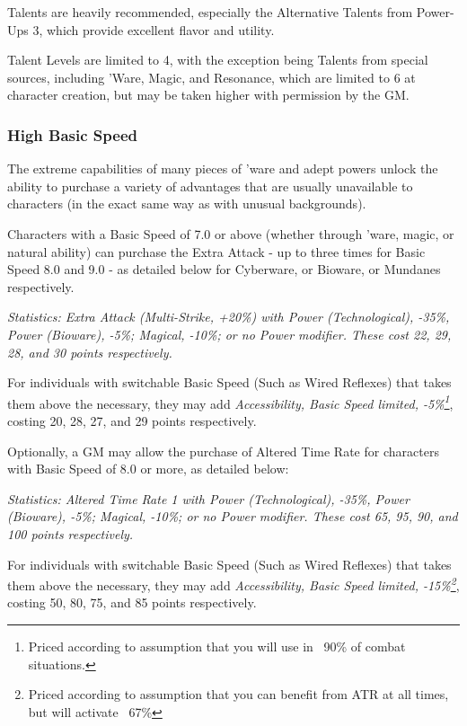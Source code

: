 \begin{multicols*}{3}
	Talents are heavily recommended, especially the Alternative Talents from Power-Ups 3, which provide excellent flavor and utility. 
	
	Talent Levels are limited to 4, with the exception being Talents from special sources, including 'Ware, Magic, and Resonance, which are limited to 6 at character creation, but may be taken higher with permission by the GM.
	
	\subsubsection{High Basic Speed}\label{high_basic_speed}
	
	The extreme capabilities of many pieces of 'ware and adept powers unlock the ability to purchase a variety of advantages that are usually unavailable to characters (in the exact same way as with unusual backgrounds).
	
	Characters with a Basic Speed of 7.0 or above (whether through 'ware, magic, or natural ability) can purchase the Extra Attack - up to three times for Basic Speed 8.0 and 9.0 - as detailed below for Cyberware, or Bioware, or Mundanes respectively.
	
	\textit{\textcolor{OliveGreen}{Statistics: Extra Attack (Multi-Strike, +20\%) with Power (Technological), -35\%, Power (Bioware), -5\%; Magical, -10\%; or no Power modifier. These cost 22, 29, 28, and 30 points respectively.}}
	
	For individuals with switchable Basic Speed (Such as Wired Reflexes) that takes them above the necessary, they may add \textit{Accessibility, Basic Speed limited, -5\%\footnote{Priced according to assumption that you will use in ~90\% of combat situations.}}, costing 20, 28, 27, and 29 points respectively.
	
	Optionally, a GM may allow the purchase of Altered Time Rate for characters with Basic Speed of 8.0 or more, as detailed below:
	
	\textit{\textcolor{OliveGreen}{Statistics: Altered Time Rate 1 with Power (Technological), -35\%, Power (Bioware), -5\%; Magical, -10\%; or no Power modifier. These cost 65, 95, 90, and 100 points respectively.}}
	
	For individuals with switchable Basic Speed (Such as Wired Reflexes) that takes them above the necessary, they may add \textit{Accessibility, Basic Speed limited, -15\%\footnote{Priced according to assumption that you can benefit from ATR at all times, but will activate ~67\%}}, costing 50, 80, 75, and 85 points respectively. 
	

\end{multicols*}
